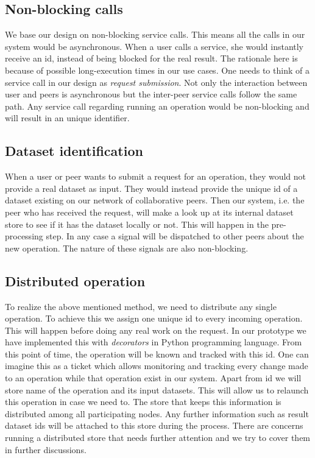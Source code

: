 \subsection{Non-blocking calls}
We base our design on non-blocking service calls. This means all the calls in our system would be asynchronous.
When a user calls a service, she would instantly receive an id, instead of being blocked for the real result.
The rationale here is because of possible long-execution times in our use cases. 
One needs to think of a service call in our design as \textit{request submission}. 
Not only the interaction between user and peers is asynchronous but the inter-peer service calls follow the same path.
Any service call regarding running an operation would be non-blocking and will result in an unique identifier.

\subsection{Dataset identification}
When a user or peer wants to submit a request for an operation, they would not provide a real dataset as input.
They would instead provide the unique id of a dataset existing on our network of collaborative peers.
Then our system, i.e. the peer who has received the request, will make a look up at its internal dataset store to see if it
has the dataset locally or not.
This will happen in the pre-processing step. 
In any case a signal will be dispatched to other peers about the new operation.
The nature of these signals are also non-blocking.

\subsection{Distributed operation}
To realize the above mentioned method, we need to distribute any single operation. To achieve this we assign one unique id
to every incoming operation. This will happen before doing any real work on the request. In our prototype we have implemented
this with \textit{decorators} in Python programming language. 
From this point of time, 
the operation will be known and tracked with this id. One can imagine this as a ticket which
allows monitoring and tracking every change made to an operation while that operation exist in our system. 
Apart from id we will store name of the operation and its input datasets. 
This will allow us to relaunch this operation in case we need to. 
The store that keeps this information is distributed among all participating nodes. 
Any further information such as result dataset ids will be attached to this store during the process. 
There are concerns running a distributed store that needs further attention and 
we try to cover them in further discussions.

